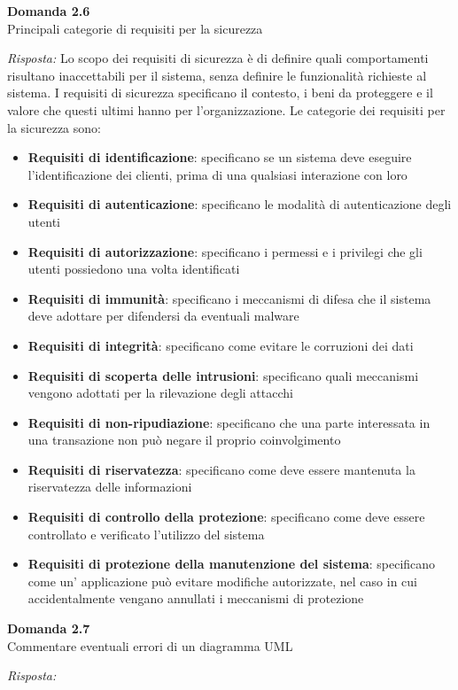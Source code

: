 \documentclass{article}
\newenvironment{problem}[2][Domanda]
    { \begin{mdframed}[backgroundcolor=gray!20] \textbf{#1 #2} \\}
    {  \end{mdframed}}
\newenvironment{solution}
    {\textit{Risposta:}}
    {}
\begin{document}
\begin{problem}{2.6}
Principali categorie di requisiti per la sicurezza
\end{problem}
\begin{solution}
Lo scopo dei requisiti di sicurezza è di definire quali comportamenti risultano inaccettabili per il sistema, senza definire le funzionalità richieste al sistema.
I requisiti di sicurezza specificano il contesto, i beni da proteggere e il valore che questi ultimi hanno per l'organizzazione.
\newline
Le categorie dei requisiti per la sicurezza sono:
\begin{itemize}
	\item \textbf{Requisiti di identificazione}: specificano se un sistema deve eseguire l'identificazione dei clienti, prima di una qualsiasi interazione con loro
	\item \textbf{Requisiti di autenticazione}: specificano le modalità di autenticazione degli utenti
	\item \textbf{Requisiti di autorizzazione}: specificano i permessi e i privilegi che gli utenti possiedono una volta identificati
	\item \textbf{Requisiti di immunità}: specificano i meccanismi di difesa che il sistema deve adottare per difendersi da eventuali malware
	\item \textbf{Requisiti di integrità}: specificano come evitare le corruzioni dei dati
	\item \textbf{Requisiti di scoperta delle intrusioni}: specificano quali meccanismi vengono adottati per la rilevazione degli attacchi
	\item \textbf{Requisiti di non-ripudiazione}: specificano che una parte interessata in una transazione non può negare il proprio coinvolgimento
	\item \textbf{Requisiti di riservatezza}: specificano come deve essere mantenuta la riservatezza delle informazioni
	\item \textbf{Requisiti di controllo della protezione}: specificano come deve essere controllato e verificato l'utilizzo del sistema
	\item \textbf{Requisiti di protezione della manutenzione del sistema}: specificano come un' applicazione può evitare modifiche autorizzate, nel caso in cui accidentalmente vengano annullati i meccanismi di protezione
\end{itemize}
\end{solution}


\begin{problem}{2.7}
Commentare eventuali errori di un diagramma UML
\end{problem}
\begin{solution}

\end{solution}
\end{document}
